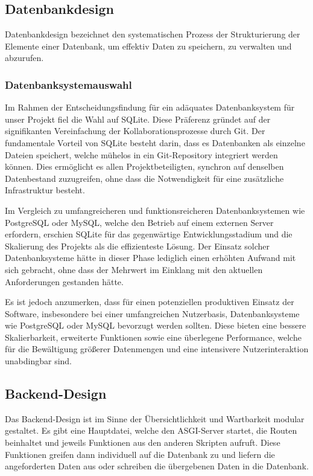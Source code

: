 \documentclass[../main.tex]{subfiles}
\begin{document}
\subsection{Datenbankdesign}

Datenbankdesign bezeichnet den systematischen Prozess der Strukturierung der Elemente einer Datenbank, um effektiv Daten zu speichern, zu verwalten
und abzurufen.

\subsubsection{Datenbanksystemauswahl}
Im Rahmen der Entscheidungsfindung für ein adäquates Datenbanksystem für unser Projekt fiel die Wahl auf SQLite. Diese Präferenz gründet auf der
signifikanten Vereinfachung der Kollaborationsprozesse durch Git. Der fundamentale Vorteil von SQLite besteht darin, dass es Datenbanken als einzelne
Dateien speichert, welche mühelos in ein Git-Repository integriert werden können. Dies ermöglicht es allen Projektbeteiligten, synchron auf denselben
Datenbestand zuzugreifen, ohne dass die Notwendigkeit für eine zusätzliche Infrastruktur besteht.

Im Vergleich zu umfangreicheren und funktionsreicheren Datenbanksystemen wie PostgreSQL oder MySQL, welche den Betrieb auf einem externen Server erfordern,
erschien SQLite für das gegenwärtige Entwicklungsstadium und die Skalierung des Projekts als die effizienteste Lösung. Der Einsatz solcher Datenbanksysteme
hätte in dieser Phase lediglich einen erhöhten Aufwand mit sich gebracht, ohne dass der Mehrwert im Einklang mit den aktuellen Anforderungen gestanden hätte.

Es ist jedoch anzumerken, dass für einen potenziellen produktiven Einsatz der Software, insbesondere bei einer umfangreichen Nutzerbasis, Datenbanksysteme
wie PostgreSQL oder MySQL bevorzugt werden sollten. Diese bieten eine bessere Skalierbarkeit, erweiterte Funktionen sowie eine überlegene Performance, welche
für die Bewältigung größerer Datenmengen und eine intensivere Nutzerinteraktion unabdingbar sind.

\subsection{Backend-Design}

Das Backend-Design ist im Sinne der Übersichtlichkeit und Wartbarkeit modular gestaltet. Es gibt eine Hauptdatei, welche den ASGI-Server startet, die Routen
beinhaltet und jeweils Funktionen aus den anderen Skripten aufruft. Diese Funktionen greifen dann individuell auf die Datenbank zu und liefern die angeforderten
Daten aus oder schreiben die übergebenen Daten in die Datenbank.
\end{document}
